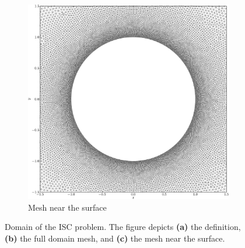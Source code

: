 \begin{figure}[p]
     \begin{subfigure}[t]{0.3\textwidth}
             \includegraphics[width=\textwidth]{figures/eulerian/ISC_mesh_surface-crop.pdf}
             \caption{Mesh near the surface}
             \label{fig:ISC_mesh_surface}
     \end{subfigure}

     \caption{Domain of the ISC problem. The figure depicts \textbf{(a)} the definition, \textbf{(b)} the full domain mesh, and \textbf{(c)} the mesh near the surface.}
     \label{fig:ISCDomain}
	\end{figure}

